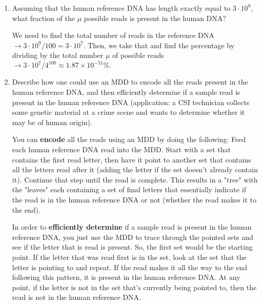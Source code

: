\documentclass[12pt]{article}
\begin{document}
\begin{enumerate}
\begin{enumerate}[label=(\alph*)]
    
    \item Assuming that the human reference DNA has length exactly equal to $3 \cdot 10^9$, what fraction of the $\mu$ possible reads is present in the human DNA?

    \color{blue}
    We need to find the total number of reads in the reference DNA $\rightarrow 3 \cdot 10^9 / 100 = 3 \cdot 10^7$. Then, we take that and find the percentage by dividing by the total number $\mu$ of possible reads $\rightarrow 3 \cdot 10^7 / 4^{100} \approx 1.87 \times 10^{-51} \%.$
    \color{black}


    
    \item Describe how one could use an MDD to encode all the reads present in the human reference DNA, and then efficiently determine if a sample read is present in the human reference DNA (application: a CSI technician collects some genetic material at a crime scene and wants to determine whether it may be of human origin).

    \color{blue}
    You can \textbf{encode} all the reads using an MDD by doing the following: Feed each human reference DNA read into the MDD. Start with a set that contains the first read letter, then have it point to another set that contains all the letters read after it (adding the letter if the set doesn't already contain it). Continue that step until the read is complete. This results in a "tree" with the "leaves" each containing a set of final letters that essentially indicate if the read is in the human reference DNA or not (whether the read makes it to the end).

    In order to \textbf{efficiently determine} if a sample read is present in the human reference DNA, you just use the MDD to trace through the pointed sets and see if the letter that is read is present. So, the first set would be the starting point. If the letter that was read first is in the set, look at the set that the letter is pointing to and repeat. If the read makes it all the way to the end following this pattern, it is present in the human reference DNA. At any point, if the letter is not in the set that's currently being pointed to, then the read is not in the human reference DNA.
    \color{black}


\end{enumerate}
\end{enumerate}
\end{document}
